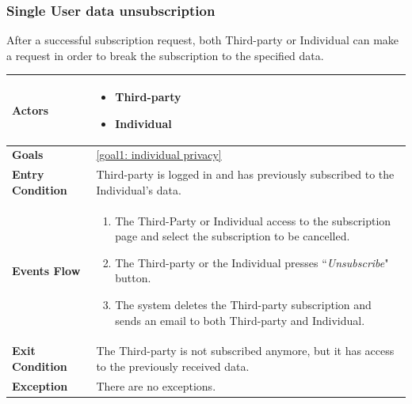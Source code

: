             
        \subsubsection{Single User data unsubscription}
            After a successful subscription request, both Third-party or Individual can make a request in order to break the subscription to the specified data.

            \begin{table}[H]
            	\centering
                
                \begin{tabular}{|p{3cm}|p{8.2cm}|}
                    \hline
                    \textbf{Actors} &  \begin{itemize}
                                            \item Third-party
                                            \item Individual
                                        \end{itemize}\\
                     \hline
                    \textbf{Goals} & \ref{goal1: individual privacy}\\ 
                     \hline
                    \textbf{Entry Condition} & Third-party is logged in and has previously subscribed to the Individual's data.\\
                     \hline
                    \textbf{Events Flow} & \begin{enumerate}
                                                \item The Third-Party or Individual access to the subscription page and select the subscription to be cancelled.
                                                \item The Third-party or the Individual presses ``\emph{Unsubscribe}" button.
                                                \item The system deletes the Third-party subscription and sends an email to both Third-party and Individual.
                                            \end{enumerate}\\
                     \hline
                    \textbf{Exit Condition} & The Third-party is not subscribed anymore, but it has access to the previously received data. \\
                     \hline
                    \textbf{Exception} & There are no exceptions. \\
                     \hline
                \end{tabular}  
            \end{table} 
            
